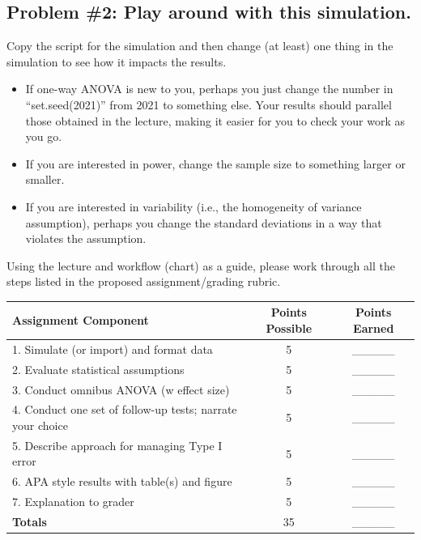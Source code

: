 \documentclass[
  english,
]{book}
\providecommand{\tightlist}{%
  \setlength{\itemsep}{0pt}\setlength{\parskip}{0pt}}
\begin{document}
\hypertarget{problem-2-play-around-with-this-simulation.}{%
\subsection{Problem \#2: Play around with this simulation.}\label{problem-2-play-around-with-this-simulation.}}

Copy the script for the simulation and then change (at least) one thing in the simulation to see how it impacts the results.

\begin{itemize}
\tightlist
\item
  If one-way ANOVA is new to you, perhaps you just change the number in ``set.seed(2021)'' from 2021 to something else. Your results should parallel those obtained in the lecture, making it easier for you to check your work as you go.
\item
  If you are interested in power, change the sample size to something larger or smaller.
\item
  If you are interested in variability (i.e., the homogeneity of variance assumption), perhaps you change the standard deviations in a way that violates the assumption.
\end{itemize}

Using the lecture and workflow (chart) as a guide, please work through all the steps listed in the proposed assignment/grading rubric.

\begin{longtable}[]{@{}lcc@{}}
\toprule
Assignment Component & Points Possible & Points Earned \\
\midrule
\endhead
1. Simulate (or import) and format data & 5 & \_\_\_\_\_ \\
2. Evaluate statistical assumptions & 5 & \_\_\_\_\_ \\
3. Conduct omnibus ANOVA (w effect size) & 5 & \_\_\_\_\_ \\
4. Conduct one set of follow-up tests; narrate your choice & 5 & \_\_\_\_\_ \\
5. Describe approach for managing Type I error & 5 & \_\_\_\_\_ \\
6. APA style results with table(s) and figure & 5 & \_\_\_\_\_ \\
7. Explanation to grader & 5 & \_\_\_\_\_ \\
\textbf{Totals} & 35 & \_\_\_\_\_ \\
\bottomrule
\end{longtable}
\end{document}
